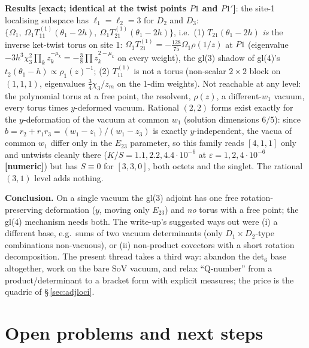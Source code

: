 \documentclass[10pt]{article}
\begin{document}
\textbf{Results} \textbf{[exact; identical at the twist points $P1$ and $P1'$]}: the site-1 localising subspace has $\ell_1=\ell_2=3$ for $D_2$ and $D_3$: $\{\Omega_1,\ \Omega_1T_{11}^{(1)}(\theta_1-2h),\ \Omega_1T_{21}^{(1)}(\theta_1-2h)\}$, i.e.\ (1) $T_{21}(\theta_1-2h)$ \emph{is} the inverse ket-twist torus on site 1: $\Omega_1T_{21}^{(1)}=-\tfrac{128}{75}\Omega_1\rho(1/z)$ at $P1$ (eigenvalue $-3h^3\chi_3^2\prod_kz_k^{-\mu_k}=-\tfrac38\prod z_k^{2-\mu_k}$ on every weight), the gl(3) shadow of gl(4)'s $t_2(\theta_1-h)\propto\rho_1(z)^{-1}$; (2) $T_{11}^{(1)}$ is not a torus (non-scalar $2\times2$ block on $(1,1,1)$, eigenvalues $\tfrac34\chi_3/z_m$ on the 1-dim weights). Not reachable at any level: the polynomial torus at a free point, the resolvent, $\rho(z)$, a different-$w_1$ vacuum, every torus times $y$-deformed vacuum. Rational $(2,2)$ forms exist exactly for the $y$-deformation of the vacuum at common $w_1$ (solution dimensions $6/5$): since $b=r_2+r_1r_3=(w_1-z_1)/(w_1-z_3)$ is exactly $y$-independent, the vacua of common $w_1$ differ only in the $E_{23}$ parameter, so this family reads $[4,1,1]$ only and untwists cleanly there ($K/S=1.1,2.2,4.4\cdot10^{-6}$ at $\varepsilon=1,2,4\cdot10^{-6}$ \textbf{[numeric]}) but has $S\equiv0$ for $[3,3,0]$, both octets and the singlet. The rational $(3,1)$ level adds nothing.

\textbf{Conclusion.} On a single vacuum the gl(3) adjoint has one free rotation-preserving deformation ($y$, moving only $E_{23}$) and \emph{no} torus with a free point; the gl(4) mechanism needs both. The write-up's suggested ways out were (i) a different base, e.g.\ sums of two vacuum determinants (only $D_1\times D_2$-type combinations non-vacuous), or (ii) non-product covectors with a short rotation decomposition. The present thread takes a third way: abandon the det$_6$ base altogether, work on the bare SoV vacuum, and relax ``Q-number'' from a product/determinant to a bracket form with explicit measures; the price is the quadric of \S\,\ref{sec:adjloci}.

\section{Open problems and next steps}\label{sec:open}
\end{document}
